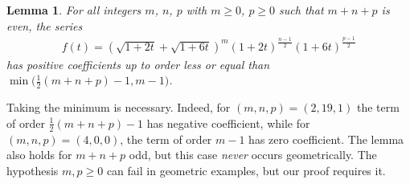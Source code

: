 \documentclass[pdftex]{sigma}
\numberwithin{equation}{section}
\newtheorem{Lemma}[Theorem]{Lemma}
\begin{document}
\begin{Lemma}\label{cl}
For all integers $m$, $n$, $p$ with $m\geq 0$, $p\geq 0$ such that $m+n+p$ is even, the series
\begin{gather*}
f(t)=\left(\sqrt{1+2t}+\sqrt{1+6t}\right)^m {(1+2t)}^{\frac{n-1}{2}} (1+6t)^{\frac{p-1}{2}}
\end{gather*}
has positive coefficients up to order less or equal than $\min\big(\frac{1}{2}(m+n+p)-1, m-1\big)$.
\end{Lemma}
Taking the minimum is necessary. Indeed, for $(m, n, p)=(2, 19, 1)$ the term of order $\frac{1}{2}(m+n+p)-1$ has negative coefficient, while for $(m, n, p)=(4, 0, 0)$, the term of order $m-1$ has zero coefficient. The lemma also holds for $m+n+p$ odd, but this case {\it never} occurs geometrically. The hypothesis $m, p\geq 0$ can fail in geometric examples, but our proof requires it.
\end{document}
